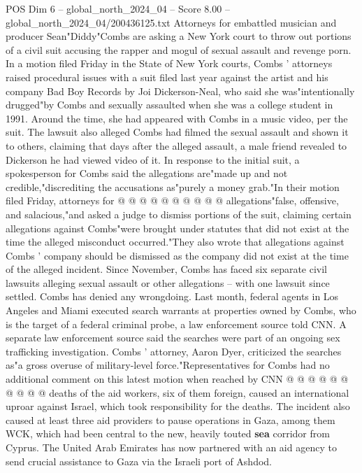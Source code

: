 \begin{textsample}{POS Dim 6 – global\_north\_2024\_04 – Score 8.00 – global\_north\_2024\_04/200436125.txt}  \label{ex:f6_pos_116}
Attorneys for embattled musician and producer Sean"Diddy"Combs are asking a New York court to throw out portions of a civil suit accusing the rapper and mogul of sexual assault and revenge porn.
In a motion filed Friday in the State of New York courts, Combs ' attorneys raised procedural issues with a suit filed last year against the artist and his company Bad Boy Records by Joi Dickerson-Neal, who said she was"intentionally drugged"by Combs and sexually assaulted when she was a college student in 1991.
Around the time, she had appeared with Combs in a music video, per the suit.
The lawsuit also alleged Combs had filmed the sexual assault and shown it to others, claiming that days after the alleged assault, a male friend revealed to Dickerson he had viewed video of it.
In response to the initial suit, a spokesperson for Combs said the allegations are"made up and not credible,"discrediting the accusations as"purely a money grab."In their motion filed Friday, attorneys for @ @ @ @ @ @ @ @ @ @ allegations"false, offensive, and salacious,"and asked a judge to dismiss portions of the suit, claiming certain allegations against Combs"were brought under statutes that did not exist at the time the alleged misconduct occurred."They also wrote that allegations against Combs ' company should be dismissed as the company did not exist at the time of the alleged incident.
Since November, Combs has faced six separate civil lawsuits alleging sexual assault or other allegations -- with one lawsuit since settled.
Combs has denied any wrongdoing.
Last month, federal agents in Los Angeles and Miami executed search warrants at properties owned by Combs, who is the target of a federal criminal probe, a law enforcement source told CNN.
A separate law enforcement source said the searches were part of an ongoing sex trafficking investigation.
Combs ' attorney, Aaron Dyer, criticized the searches as"a gross overuse of military-level force."Representatives for Combs had no additional comment on this latest motion when reached by CNN @ @ @ @ @ @ @ @ @ @ deaths of the aid workers, six of them foreign, caused an international uproar against Israel, which took responsibility for the deaths.
The incident also caused at least three aid providers to pause operations in Gaza, among them WCK, which had been central to the new, heavily touted \textbf{sea} corridor from Cyprus.
The United Arab Emirates has now partnered with an aid agency to send crucial assistance to Gaza via the Israeli port of Ashdod.

\end{textsample}
